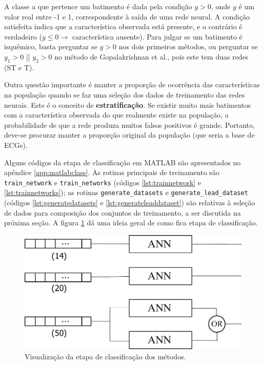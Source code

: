 A classe a que pertence um batimento é dada pela condição $y>0$, onde $y$ é um valor real entre -1 e 1, correspondente à saída de uma rede neural. A condição satisfeita indica que a característica observada está presente, e o contrário é verdadeiro ($y\leq 0 \rightarrow$ característica ausente). Para julgar se um batimento é isquêmico, basta perguntar se $y>0$ nos dois primeiros métodos, ou perguntar se $y_1>0$ || $y_2>0$ no método de Gopalakrishnan et al., pois este tem duas redes (ST e T).

Outra questão importante é manter a proporção de ocorrência das características na população quando se faz uma seleção dos dados de treinamento das redes neurais. Este é o conceito de \textbf{estratificação}. Se existir muito mais batimentos com a característica observada do que realmente existe na população, a probabilidade de que a rede produza muitos falsos positivos é grande. Portanto, deve-se procurar manter a proporção original da população (que seria a base de ECGs).

Alguns códigos da etapa de classificação em MATLAB são apresentados no apêndice \ref{app:matlabclass}. As rotinas principais de treinamento são \texttt{train\_network} e \texttt{train\_networks} (códigos \ref{lst:trainnetwork} e \ref{lst:trainnetworks}); as rotinas \texttt{generate\_datasets} e \texttt{generate\_lead\_dataset} (códigos \ref{lst:generatedatasets} e \ref{lst:generateleaddataset}) são relativas à seleção de dados para composição dos conjuntos de treinamento, a ser discutida na próxima seção. A figura \ref{fig:vectorsandnets} dá uma ideia geral de como fica etapa de classificação.

\begin{figure}[ht]
    \centering
    \includegraphics[width=350pt]{figures/chap6-vectors-and-networks.pdf}
    \caption[Visualização da etapa de classificação dos métodos]{Visualização da etapa de classificação dos métodos.}
    \label{fig:vectorsandnets}
\end{figure}


